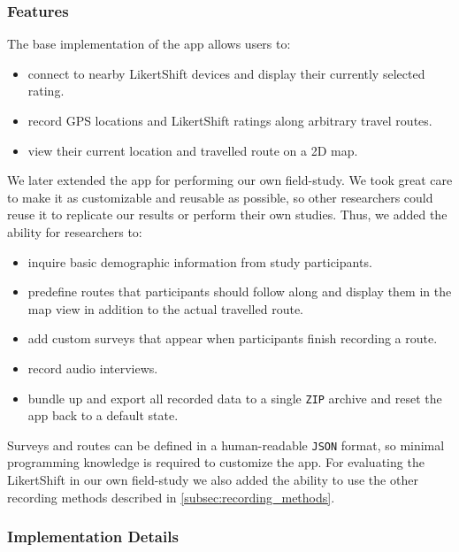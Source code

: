 \subsubsection{Features}

The base implementation of the app allows users to:

\begin{itemize}[itemsep=0em]
    \item connect to nearby LikertShift devices and display their currently selected rating.
    \item record GPS locations and LikertShift ratings along arbitrary travel routes.
    \item view their current location and travelled route on a 2D map.
\end{itemize}

\noindent
We later extended the app for performing our own field-study.
We took great care to make it as customizable and reusable as possible, so other researchers could reuse it to replicate our results or perform their own studies.
Thus, we added the ability for researchers to:

\begin{itemize}[itemsep=0em]
    \item inquire basic demographic information from study participants.
    \item predefine routes that participants should follow along and display them in the map view in addition to the actual travelled route.
    \item add custom surveys that appear when participants finish recording a route.
    \item record audio interviews.
    \item bundle up and export all recorded data to a single \texttt{ZIP} archive and reset the app back to a default state.
\end{itemize}

\noindent
Surveys and routes can be defined in a human-readable \texttt{JSON} format, so minimal programming knowledge is required to customize the app.
For evaluating the LikertShift in our own field-study we also added the ability to use the other recording methods described in \autoref{subsec:recording_methods}.

\subsubsection{Implementation Details}

\def\mapscreen{\textsf{Map Screen}\xspace}
\def\routesscreen{\textsf{Routes Screen}\xspace}
\def\devicesscreen{\textsf{Devices Screen}\xspace}
\def\settingsscreen{\textsf{Settings Screen}\xspace}

